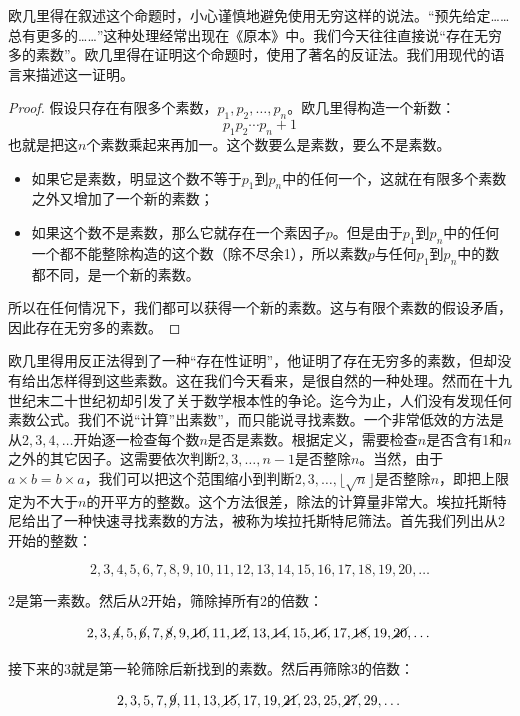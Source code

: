 \documentclass[b5paper]{ctexart}
\begin{document}
欧几里得在叙述这个命题时，小心谨慎地避免使用无穷这样的说法。“预先给定……总有更多的……”这种处理经常出现在《原本》中。我们今天往往直接说“存在无穷多的素数”。欧几里得在证明这个命题时，使用了著名的反证法。我们用现代的语言来描述这一证明。

\begin{proof}
假设只存在有限多个素数，$p_1, p_2, \dotsc, p_n$。欧几里得构造一个新数：
\[
p_1 p_2 \dotsm p_n + 1
\]
也就是把这$n$个素数乘起来再加一。这个数要么是素数，要么不是素数。

\begin{itemize}
\item 如果它是素数，明显这个数不等于$p_1$到$p_n$中的任何一个，这就在有限多个素数之外又增加了一个新的素数；
\item 如果这个数不是素数，那么它就存在一个素因子$p$。但是由于$p_1$到$p_n$中的任何一个都不能整除构造的这个数（除不尽余1），所以素数$p$与任何$p_1$到$p_n$中的数都不同，是一个新的素数。
\end{itemize}
所以在任何情况下，我们都可以获得一个新的素数。这与有限个素数的假设矛盾，因此存在无穷多的素数。
\end{proof}

\label{sec:sieve}  
欧几里得用反正法得到了一种“存在性证明”，他证明了存在无穷多的素数，但却没有给出怎样得到这些素数。这在我们今天看来，是很自然的一种处理。然而在十九世纪末二十世纪初却引发了关于数学根本性的争论。迄今为止，人们没有发现任何素数公式。我们不说“计算”出素数”，而只能说寻找素数。一个非常低效的方法是从$2, 3, 4, \dotsc$开始逐一检查每个数$n$是否是素数。根据定义，需要检查$n$是否含有1和$n$之外的其它因子。这需要依次判断$2, 3, \dotsc, n - 1 $是否整除$n$。当然，由于$a \times b = b \times a$，我们可以把这个范围缩小到判断$2, 3, \dotsc, \lfloor \sqrt{n} \rfloor$是否整除$n$，即把上限定为不大于$n$的开平方的整数。这个方法很差，除法的计算量非常大。埃拉托斯特尼给出了一种快速寻找素数的方法，被称为埃拉托斯特尼筛法。首先我们列出从2开始的整数：

\[2, 3, 4, 5, 6, 7, 8, 9, 10, 11, 12, 13, 14, 15, 16, 17, 18, 19, 20, \dotsc \]

2是第一素数。然后从2开始，筛除掉所有2的倍数：

\[2, 3, \cancel{4}, 5, \cancel{6}, 7, \cancel{8}, 9, \cancel{10}, 11, \cancel{12}, 13, \cancel{14}, 15, \cancel{16}, 17, \cancel{18}, 19, \cancel{20}, \dotsc\]


接下来的3就是第一轮筛除后新找到的素数。然后再筛除3的倍数：

\[2, 3, 5, 7, \cancel{9}, 11, 13, \cancel{15}, 17, 19, \cancel{21}, 23, 25, \cancel{27}, 29, \dotsc\]
\end{document}
